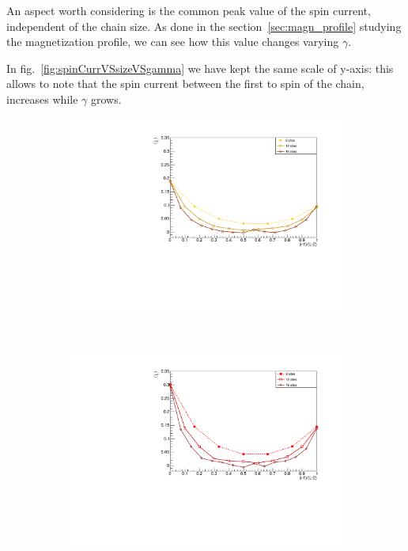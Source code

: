 An aspect worth considering is the common peak value of the spin current, independent of the chain size. As done in the section~\ref{sec:magn_profile} studying the magnetization profile, we can see how this value changes varying $\gamma$. 

In fig.~\ref{fig:spinCurrVSsizeVSgamma} we have kept the same scale of y-axis: this allows to note that the spin current between the first to spin of the chain, increases while $\gamma$ grows. 

\begin{figure}[H]
\centering
\begin{subfigure}{\columnwidth}
\centering
    \includegraphics[scale=0.6]{Figures/spinCurrVSsize_Gamma05.pdf}
    \label{fig:8sites_LMvsGamma}
\end{subfigure}\\
\begin{subfigure}{\columnwidth}
\centering
    \includegraphics[scale=0.6]{Figures/spinCurrVSsize_Gamma1.pdf}

\end{subfigure}
\end{figure}
